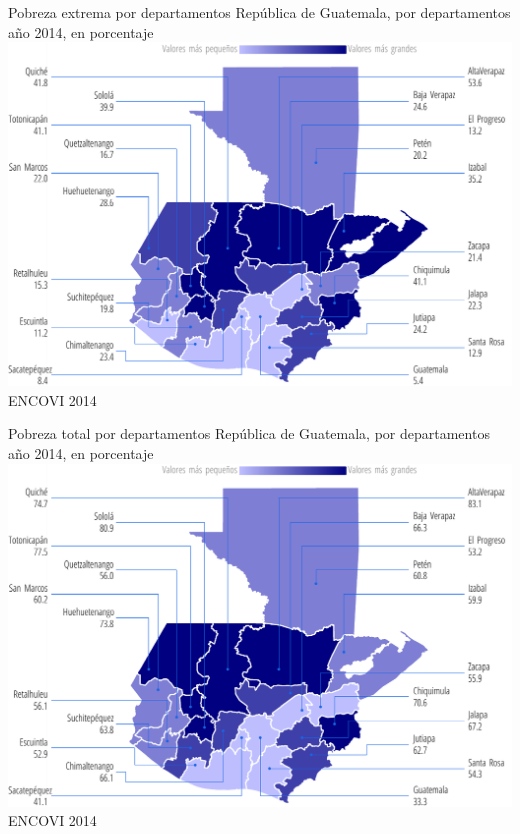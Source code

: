                     {%
                    }%
                    {%
                    	Pobreza extrema por departamentos
                    } %
                    {%
                    	República de Guatemala, por departamentos año 2014, en porcentaje} %
                    {%
                    	\includegraphics[width=52\cuadri]{graficas/1_18.pdf}}%
                    {%
                    	ENCOVI 2014} %
                    
                    
                    {%
                    }%
                    {%
                    	Pobreza total  por departamentos
                    } %
                    {%
                    	República de Guatemala, por departamentos año 2014, en porcentaje} %
                    {%
                    	\includegraphics[width=52\cuadri]{graficas/1_19.pdf}}%
                    {%
                    	ENCOVI 2014} %
         
